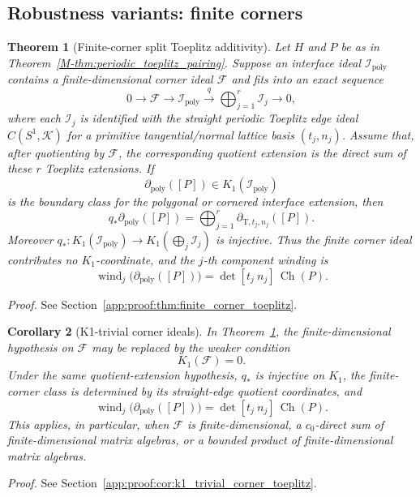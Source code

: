 \documentclass[11pt]{article}
\numberwithin{equation}{section}
\newtheorem{theorem}{Theorem}[section]
\newtheorem{corollary}[theorem]{Corollary}
\theoremstyle{definition}
\theoremstyle{remark}
\newcommand{\proofref}[1]{%
  \par\noindent\emph{Proof.} See Section~\ref{#1}.\par\medskip
}
\newcommand{\proofappendixref}[1]{\proofref{#1}}
\newcommand{\Ch}{\operatorname{Ch}}
\begin{document}
\subsection{Robustness variants: finite corners}\label{app:robustness_finite_corners}
\begin{theorem}[Finite-corner split Toeplitz additivity]\label{thm:finite_corner_toeplitz}
Let \(H\) and \(P\) be as in Theorem~\ref{M-thm:periodic_toeplitz_pairing}. Suppose an interface
ideal \(\mathcal I_{\mathrm{poly}}\) contains a finite-dimensional corner ideal
\(\mathcal F\) and fits into an exact sequence
\[
0\longrightarrow \mathcal F\longrightarrow \mathcal I_{\mathrm{poly}}
\xrightarrow{\;q\;}
\bigoplus_{j=1}^r \mathcal I_j
\longrightarrow0,
\]
where each \(\mathcal I_j\) is identified with the straight periodic Toeplitz edge ideal
\(C(S^1,\mathcal K)\) for a primitive tangential/normal lattice basis \((t_j,n_j)\). Assume that,
after quotienting by \(\mathcal F\), the corresponding quotient extension is the direct sum of
these \(r\) Toeplitz extensions. If
\[
\partial_{\mathrm{poly}}([P])\in K_1(\mathcal I_{\mathrm{poly}})
\]
is the boundary class for the polygonal or cornered interface extension, then
\[
q_*\partial_{\mathrm{poly}}([P])
=
\bigoplus_{j=1}^r\partial_{\mathrm T,t_j,n_j}([P]).
\]
Moreover \(q_*:K_1(\mathcal I_{\mathrm{poly}})\to
K_1(\bigoplus_j\mathcal I_j)\) is injective. Thus the finite corner ideal contributes no
\(K_1\)-coordinate, and the \(j\)-th component winding is
\[
\operatorname{wind}_j\bigl(\partial_{\mathrm{poly}}([P])\bigr)
=
\det[t_j\ n_j]\,\Ch(P).
\]
\end{theorem}
\proofappendixref{app:proof:thm:finite_corner_toeplitz}




\begin{corollary}[K1-trivial corner ideals]\label{cor:k1_trivial_corner_toeplitz}
In Theorem~\ref{thm:finite_corner_toeplitz}, the finite-dimensional hypothesis on
\(\mathcal F\) may be replaced by the weaker condition
\[
K_1(\mathcal F)=0.
\]
Under the same quotient-extension hypothesis, \(q_*\) is injective on \(K_1\), the finite-corner
class is determined by its straight-edge quotient coordinates, and
\[
\operatorname{wind}_j\bigl(\partial_{\mathrm{poly}}([P])\bigr)
=
\det[t_j\ n_j]\,\Ch(P).
\]
This applies, in particular, when \(\mathcal F\) is finite-dimensional, a \(c_0\)-direct sum of
finite-dimensional matrix algebras, or a bounded product of finite-dimensional matrix algebras.
\end{corollary}
\proofappendixref{app:proof:cor:k1_trivial_corner_toeplitz}
\end{document}
